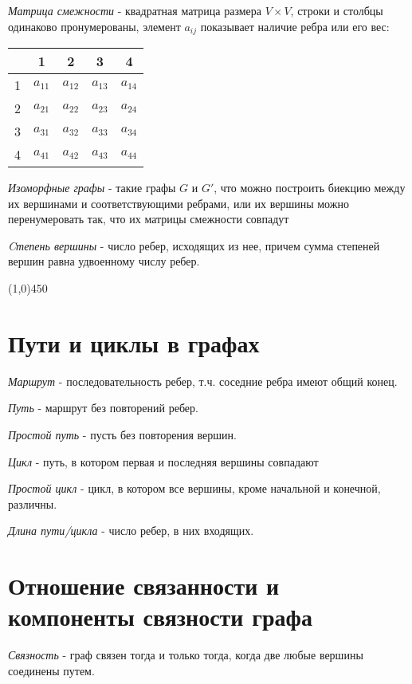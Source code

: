 \documentclass[a4paper,12pt]{article}
\begin{document}
	\textit{Матрица смежности} - квадратная матрица размера $V \times V$, строки и столбцы одинаково пронумерованы, элемент $a_{ij}$ показывает наличие ребра или его вес:
	\begin{center}
		\begin{tabular}{c|c|c|c|c}
			&1	&2	&3	&4 	\\ \hline
			1	&$a_{11}$	&$a_{12}$	&$a_{13}$	&$a_{14}$ \\ \hline
			2	&$a_{21}$	&$a_{22}$	&$a_{23}$	&$a_{24}$	\\ \hline
			3	&$a_{31}$	&$a_{32}$	&$a_{33}$	&$a_{34}$	\\ \hline
			4	&$a_{41}$	&$a_{42}$	&$a_{43}$	&$a_{44}$ 
		\end{tabular}
	\end{center}
	
	
	
	\textit{Изоморфные графы} - такие графы $G$ и $G'$, что можно построить биекцию между их вершинами и соответствующими ребрами, или их вершины можно перенумеровать так, что их матрицы смежности совпадут
	
	\textit{Cтепень вершины} - число ребер, исходящих из нее, причем сумма степеней вершин равна удвоенному числу ребер.
	
	\begin{center}
		\line(1,0){450}
	\end{center}
	
	\section*{Пути и циклы в графах}
	\textit{Маршрут} - последовательность ребер, т.ч. соседние ребра имеют общий конец.
	
	\textit{Путь} - маршрут без повторений ребер.
	
	\textit{Простой путь} - пусть без повторения вершин.
	
	\textit{Цикл} - путь, в котором первая и последняя вершины совпадают 
	
	\textit{Простой цикл} - цикл, в котором все вершины, кроме начальной и конечной, различны.
	
	\textit{Длина пути/цикла} - число ребер, в них входящих.
	
	\section*{Отношение связанности и компоненты связности графа}
	\textit{Связность} - граф связен тогда и только тогда, когда две любые вершины соединены путем.
	
\end{document}

